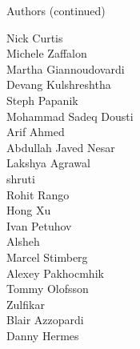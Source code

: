 \begin{frame}{Authors (continued)}
\begin{multicols}{5}
Nick Curtis\\
Michele Zaffalon\\
Martha Giannoudovardi\\
Devang Kulshreshtha\\
Steph Papanik\\
Mohammad Sadeq Dousti\\
Arif Ahmed\\
Abdullah Javed Nesar\\
Lakshya Agrawal\\
shruti\\
Rohit Rango\\
Hong Xu\\
Ivan Petuhov\\
Alsheh\\
Marcel Stimberg\\
Alexey Pakhocmhik\\
Tommy Olofsson\\
Zulfikar\\
Blair Azzopardi\\
Danny Hermes\\
\end{multicols}
\end{frame}
